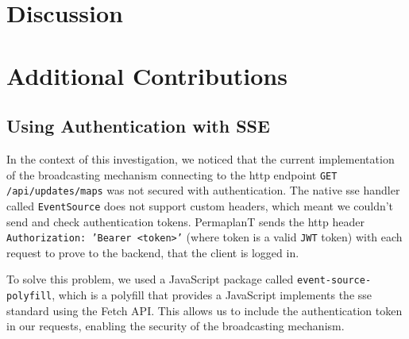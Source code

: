 \documentclass[final,draft]{vutinfth} %
\begin{document}
\chapter{Discussion}

\chapter{Additional Contributions}

\section{Using Authentication with SSE}

In the context of this investigation, we noticed that the current implementation of the broadcasting mechanism connecting to the \gls{http} endpoint \texttt{GET /api/updates/maps} was not secured with authentication.
The native \gls{sse} handler called \texttt{EventSource} does not support custom headers, which meant we couldn't send and check authentication tokens.
PermaplanT sends the \gls{http} header \texttt{Authorization: 'Bearer <token>'} (where token is a valid \texttt{JWT} token) with each request to prove to the backend, that the client is logged in.

To solve this problem, we used a JavaScript package called \texttt{event-source-polyfill}, which is a polyfill that provides a JavaScript implements the \gls{sse} standard using the Fetch API. 
This allows us to include the authentication token in our requests, enabling the security of the broadcasting mechanism.

\printglossary[type=\acronymtype,title=Acronyms]

\backmatter



\end{document}
